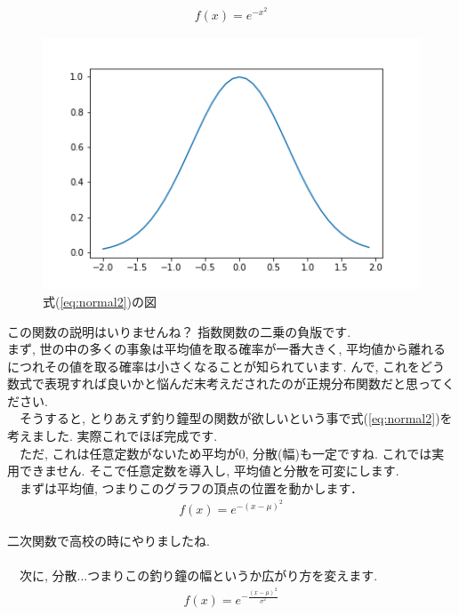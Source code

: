 \documentclass[11pt,a4paper]{jsarticle}                    %
\begin{document}
\begin{eqnarray}
\label{eq:normal2}
f(x) = e^{-x^2}
\end{eqnarray}

\begin{figure}[H]
\label{im:normal}
  \centering
  \includegraphics[width=120mm,bb=0 0 432 288]{../figures/normal2.png}
  \caption{式(\ref{eq:normal2})の図}
\end{figure}

この関数の説明はいりませんね？ 指数関数の二乗の負版です.\\
まず, 世の中の多くの事象は平均値を取る確率が一番大きく, 平均値から離れるにつれその値を取る確率は小さくなることが知られています. んで, これをどう数式で表現すれば良いかと悩んだ末考えだされたのが正規分布関数だと思ってください.\\
　そうすると, とりあえず釣り鐘型の関数が欲しいという事で式(\ref{eq:normal2})を考えました. 実際これでほぼ完成です.\\
　ただ, これは任意定数がないため平均が0, 分散(幅)も一定ですね. これでは実用できません. そこで任意定数を導入し, 平均値と分散を可変にします. \\
　まずは平均値, つまりこのグラフの頂点の位置を動かします．\\

\begin{eqnarray}
\label{eq:normal3}
f(x) = e^{-(x-\mu)^2}
\end{eqnarray}

二次関数で高校の時にやりましたね.\\
\\
　次に, 分散...つまりこの釣り鐘の幅というか広がり方を変えます. \\

\begin{eqnarray}
\label{eq:normal4}
f(x) = e^{-\frac{(x-\mu)^2}{\sigma^2}}
\end{eqnarray}
\end{document}
